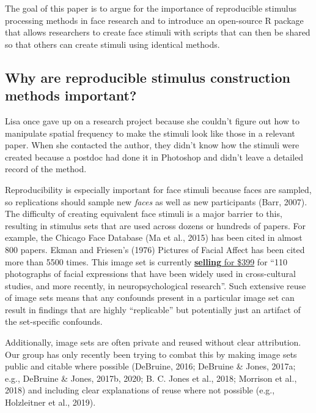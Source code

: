 \documentclass[
  man,floatsintext]{apa6}
\begin{document}
The goal of this paper is to argue for the importance of reproducible stimulus processing methods in face research and to introduce an open-source R package that allows researchers to create face stimuli with scripts that can then be shared so that others can create stimuli using identical methods.

\hypertarget{why-are-reproducible-stimulus-construction-methods-important}{%
\subsection{Why are reproducible stimulus construction methods important?}\label{why-are-reproducible-stimulus-construction-methods-important}}

Lisa once gave up on a research project because she couldn't figure out how to manipulate spatial frequency to make the stimuli look like those in a relevant paper. When she contacted the author, they didn't know how the stimuli were created because a postdoc had done it in Photoshop and didn't leave a detailed record of the method.

Reproducibility is especially important for face stimuli because faces are sampled, so replications should sample new \emph{faces} as well as new participants (Barr, 2007). The difficulty of creating equivalent face stimuli is a major barrier to this, resulting in stimulus sets that are used across dozens or hundreds of papers. For example, the Chicago Face Database (Ma et al., 2015) has been cited in almost 800 papers. Ekman and Friesen's (1976) Pictures of Facial Affect has been cited more than 5500 times. This image set is currently \href{https://www.paulekman.com/product/pictures-of-facial-affect-pofa/}{\textbf{selling} for \$399} for ``110 photographs of facial expressions that have been widely used in cross-cultural studies, and more recently, in neuropsychological research''. Such extensive reuse of image sets means that any confounds present in a particular image set can result in findings that are highly ``replicable'' but potentially just an artifact of the set-specific confounds.

Additionally, image sets are often private and reused without clear attribution. Our group has only recently been trying to combat this by making image sets public and citable where possible (DeBruine, 2016; DeBruine \& Jones, 2017a; e.g., DeBruine \& Jones, 2017b, 2020; B. C. Jones et al., 2018; Morrison et al., 2018) and including clear explanations of reuse where not possible (e.g., Holzleitner et al., 2019).
\end{document}
